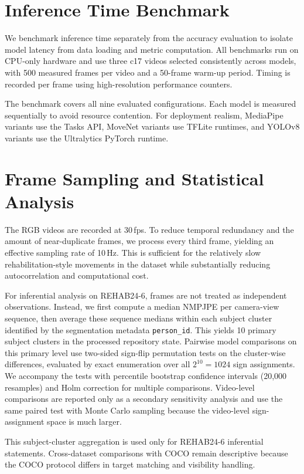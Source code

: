 \section{Inference Time Benchmark}
\label{sec:inference-method}

We benchmark inference time separately from the accuracy evaluation to isolate model latency from data loading and metric computation. All benchmarks run on CPU-only hardware and use three c17 videos selected consistently across models, with 500 measured frames per video and a 50-frame warm-up period. Timing is recorded per frame using high-resolution performance counters.

The benchmark covers all nine evaluated configurations. Each model is measured sequentially to avoid resource contention. For deployment realism, MediaPipe variants use the Tasks API, MoveNet variants use TFLite runtimes, and YOLOv8 variants use the Ultralytics PyTorch runtime.

\section{Frame Sampling and Statistical Analysis}
\label{sec:frame-sampling}

The RGB videos are recorded at 30\,fps. To reduce temporal redundancy and the amount of near-duplicate frames, we process every third frame, yielding an effective sampling rate of 10\,Hz. This is sufficient for the relatively slow rehabilitation-style movements in the dataset while substantially reducing autocorrelation and computational cost.

For inferential analysis on REHAB24-6, frames are not treated as independent observations. Instead, we first compute a median NMPJPE per camera-view sequence, then average these sequence medians within each subject cluster identified by the segmentation metadata \texttt{person\_id}. This yields 10 primary subject clusters in the processed repository state. Pairwise model comparisons on this primary level use two-sided sign-flip permutation tests on the cluster-wise differences, evaluated by exact enumeration over all $2^{10}=1024$ sign assignments. We accompany the tests with percentile bootstrap confidence intervals (20{,}000 resamples) and Holm correction for multiple comparisons. Video-level comparisons are reported only as a secondary sensitivity analysis and use the same paired test with Monte Carlo sampling because the video-level sign-assignment space is much larger.

This subject-cluster aggregation is used only for REHAB24-6 inferential statements. Cross-dataset comparisons with COCO remain descriptive because the COCO protocol differs in target matching and visibility handling.
